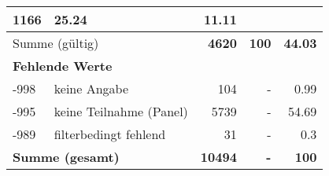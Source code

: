 \begin{longtable}{lXrrr}
       \num{1166} &
       \num[round-mode=places,round-precision=2]{25,24} &
         \num[round-mode=places,round-precision=2]{11,11} \\
     \midrule
     \multicolumn{2}{l}{Summe (gültig)} &
       \textbf{\num{4620}} &
     \textbf{100} &
       \textbf{\num[round-mode=places,round-precision=2]{44,03}} \\
     \multicolumn{5}{l}{\textbf{Fehlende Werte}}\\
       -998 &
       keine Angabe &
         \num{104} &
        - &
         \num[round-mode=places,round-precision=2]{0,99} \\
       -995 &
       keine Teilnahme (Panel) &
         \num{5739} &
        - &
         \num[round-mode=places,round-precision=2]{54,69} \\
       -989 &
       filterbedingt fehlend &
         \num{31} &
        - &
         \num[round-mode=places,round-precision=2]{0,3} \\
     \midrule
     \multicolumn{2}{l}{\textbf{Summe (gesamt)}} &
          \textbf{\num{10494}} &
        \textbf{-} &
        \textbf{100} \\
     \bottomrule
     \end{longtable}
     
